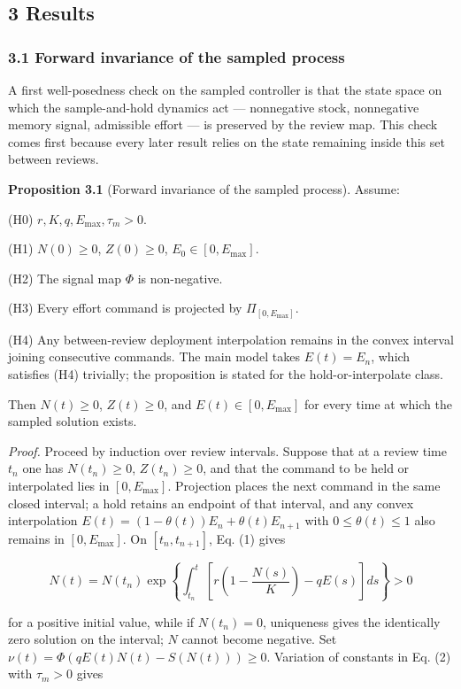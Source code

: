\documentclass[11pt]{article}
\begin{document}
\subsection{3 Results}\label{results}

\subsubsection{3.1 Forward invariance of the sampled
process}\label{forward-invariance-of-the-sampled-process}

A first well-posedness check on the sampled controller is that the state
space on which the sample-and-hold dynamics act --- nonnegative stock,
nonnegative memory signal, admissible effort --- is preserved by the
review map. This check comes first because every
later result relies on the state remaining inside this set between
reviews.

\textbf{Proposition 3.1} (Forward invariance of the sampled process).
Assume:

(H0) \(r,K,q,E_{\max},\tau_m>0\).

(H1) \(N(0)\ge 0\), \(Z(0)\ge 0\), \(E_0\in[0,E_{\max}]\).

(H2) The signal map \(\Phi\) is non-negative.

(H3) Every effort command is projected by \(\Pi_{[0,E_{\max}]}\).

(H4) Any between-review deployment interpolation remains in the convex
interval joining consecutive commands. The main model takes \(E(t)=E_n\), which satisfies (H4) trivially; the proposition is stated for the hold-or-interpolate class.

Then \(N(t)\ge 0\), \(Z(t)\ge 0\), and \(E(t)\in[0,E_{\max}]\) for every
time at which the sampled solution exists.

\emph{Proof.} Proceed by induction over review intervals. Suppose that
at a review time \(t_n\) one has \(N(t_n)\ge 0\), \(Z(t_n)\ge 0\), and
that the command to be held or interpolated lies in \([0,E_{\max}]\).
Projection places the next command in the same closed interval; a hold
retains an endpoint of that interval, and any convex interpolation
\(E(t)=(1-\theta(t))E_n+\theta(t)E_{n+1}\) with \(0\le\theta(t)\le 1\)
also remains in \([0,E_{\max}]\). On \([t_n,t_{n+1}]\), Eq. (1) gives

\[
N(t)=N(t_n)\exp\left\{\int_{t_n}^{t}\left[r\left(1-\frac{N(s)}{K}\right)-qE(s)\right]ds\right\}>0
\]

for a positive initial value, while if \(N(t_n)=0\), uniqueness gives
the identically zero solution on the interval; \(N\) cannot become
negative. Set \(\nu(t)=\Phi(qE(t)N(t)-S(N(t)))\ge 0\). Variation of
constants in Eq. (2) with \(\tau_m>0\) gives
\end{document}
